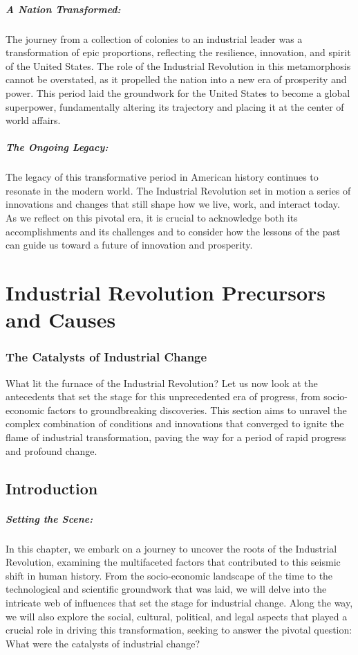 \documentclass[a4paper,12pt]{book}
\begin{document}
\paragraph{A Nation Transformed:}
The journey from a collection of colonies to an industrial leader was a transformation of epic proportions, reflecting the resilience, innovation, and spirit of the United States. The role of the Industrial Revolution in this metamorphosis cannot be overstated, as it propelled the nation into a new era of prosperity and power. This period laid the groundwork for the United States to become a global superpower, fundamentally altering its trajectory and placing it at the center of world affairs.

\paragraph{The Ongoing Legacy:}
The legacy of this transformative period in American history continues to resonate in the modern world. The Industrial Revolution set in motion a series of innovations and changes that still shape how we live, work, and interact today. As we reflect on this pivotal era, it is crucial to acknowledge both its accomplishments and its challenges and to consider how the lessons of the past can guide us toward a future of innovation and prosperity.

\chapter{Industrial Revolution Precursors and Causes}
\subsection*{The Catalysts of Industrial Change}
What lit the furnace of the Industrial Revolution? Let us now look at the antecedents that set the stage for this unprecedented era of progress, from socio-economic factors to groundbreaking discoveries. This section aims to unravel the complex combination of conditions and innovations that converged to ignite the flame of industrial transformation, paving the way for a period of rapid progress and profound change.

\section*{Introduction}

\paragraph{Setting the Scene:}
In this chapter, we embark on a journey to uncover the roots of the Industrial Revolution, examining the multifaceted factors that contributed to this seismic shift in human history. From the socio-economic landscape of the time to the technological and scientific groundwork that was laid, we will delve into the intricate web of influences that set the stage for industrial change. Along the way, we will also explore the social, cultural, political, and legal aspects that played a crucial role in driving this transformation, seeking to answer the pivotal question: What were the catalysts of industrial change?
\end{document}
